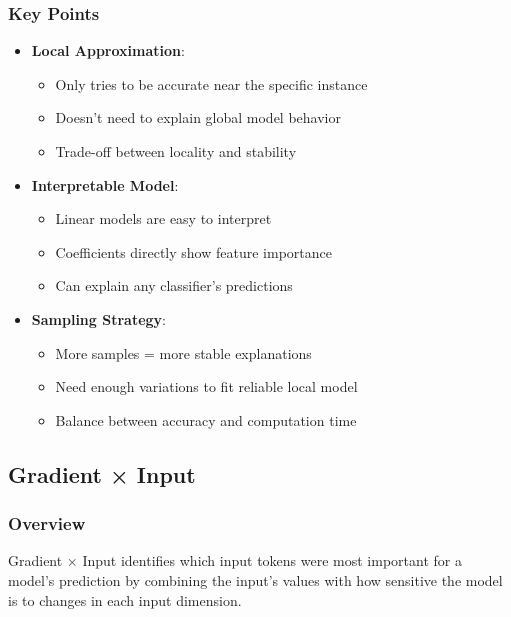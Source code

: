 \documentclass{article}
\begin{document}
\subsubsection{Key Points}
\begin{itemize}
    \item \textbf{Local Approximation}:
        \begin{itemize}
            \item Only tries to be accurate near the specific instance
            \item Doesn't need to explain global model behavior
            \item Trade-off between locality and stability
        \end{itemize}
    \item \textbf{Interpretable Model}:
        \begin{itemize}
            \item Linear models are easy to interpret
            \item Coefficients directly show feature importance
            \item Can explain any classifier's predictions
        \end{itemize}
    \item \textbf{Sampling Strategy}:
        \begin{itemize}
            \item More samples = more stable explanations
            \item Need enough variations to fit reliable local model
            \item Balance between accuracy and computation time
        \end{itemize}
\end{itemize}

\subsection{Gradient × Input}

\subsubsection{Overview}
Gradient × Input identifies which input tokens were most important for a model's prediction by combining the input's values with how sensitive the model is to changes in each input dimension.
\end{document}
